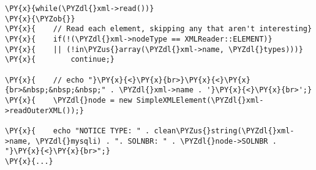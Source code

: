 \begin{Verbatim}[commandchars=\\\{\}]
\PY{x}{while(\PYZdl{}xml->read())}
\PY{x}{\PYZob{}}
\PY{x}{    // Read each element, skipping any that aren't interesting}
\PY{x}{    if(!(\PYZdl{}xml->nodeType == XMLReader::ELEMENT)}
\PY{x}{    || (!in\PYZus{}array(\PYZdl{}xml->name, \PYZdl{}types)))}
\PY{x}{        continue;}

\PY{x}{    // echo "}\PY{x}{<}\PY{x}{br>}\PY{x}{<}\PY{x}{br>&nbsp;&nbsp;&nbsp;" . \PYZdl{}xml->name . '}\PY{x}{<}\PY{x}{br>';}
\PY{x}{    \PYZdl{}node = new SimpleXMLElement(\PYZdl{}xml->readOuterXML());}

\PY{x}{    echo "NOTICE TYPE: " . clean\PYZus{}string(\PYZdl{}xml->name, \PYZdl{}mysqli) . ". SOLNBR: " . \PYZdl{}node->SOLNBR . "}\PY{x}{<}\PY{x}{br>";}
\PY{x}{...}
\end{Verbatim}
